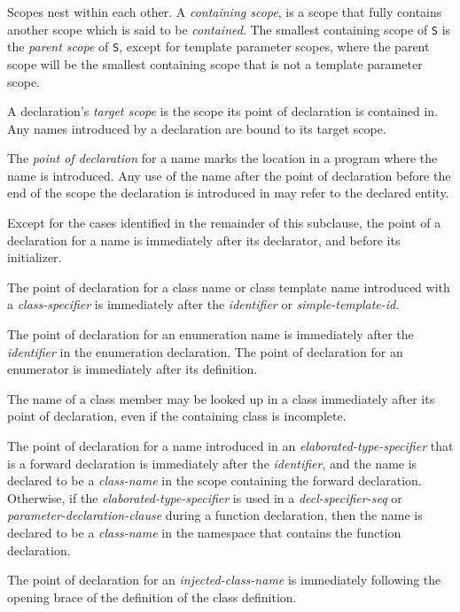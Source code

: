 \p Scopes nest within each other. A \textit{containing scope}, is a scope that
fully contains another scope which is said to be \textit{contained}. The
smallest containing scope of \texttt{S} is the \textit{parent scope} of
\texttt{S}, except for template parameter scopes, where the parent scope will be
the smallest containing scope that is not a template parameter scope.

\p A declaration's \textit{target scope} is the scope its point of declaration
is contained in. Any names introduced by a declaration are bound to its target
scope.


\p The \textit{point of declaration} for a name marks the location in a program
where the name is introduced. Any use of the name after the point of declaration
before the end of the scope the declaration is introduced in may refer to the
declared entity.

\p Except for the cases identified in the remainder of this subclause, the point
of a declaration for a name is immediately after its declarator, and before its
initializer.

\p The point of declaration for a class name or class template name introduced
with a \textit{class-specifier} is immediately after the \textit{identifier} or
\textit{simple-template-id}.

\p The point of declaration for an enumeration name is immediately after the
\textit{identifier} in the enumeration declaration. The point of declaration for
an enumerator is immediately after its definition.

\p The name of a class member may be looked up in a class immediately after its
point of declaration, even if the containing class is incomplete.

\p The point of declaration for a name introduced in an
\textit{elaborated-type-specifier} that is a forward declaration is immediately
after the \textit{identifier}, and the name is declared to be a
\textit{class-name} in the scope containing the forward declaration. Otherwise,
if the \textit{elaborated-type-specifier} is used in a
\textit{decl-specifier-seq} or \textit{parameter-declaration-clause} during a
function declaration, then the name is declared to be a \textit{class-name} in
the namespace that contains the function declaration.

\p The point of declaration for an \textit{injected-class-name} is immediately
following the opening brace of the definition of the class definition.

